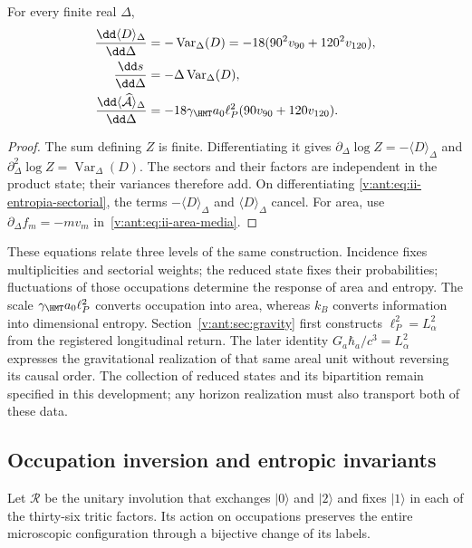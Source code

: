 \begin{proposition}
For every finite real $\Delta$,
\begin{align}
 \frac{\dd\langle D\rangle_\Delta}{\dd\Delta}
 &=-\operatorname{Var}_\Delta(D)
   =-18(90^2v_{90}+120^2v_{120}),\\
 \frac{\dd s}{\dd\Delta}
 &=-\Delta\operatorname{Var}_\Delta(D),
 \label{v:ant:eq:ii-respuesta-entropica}\\
 \frac{\dd\langle\widehat{\mathcal A}\rangle_\Delta}{\dd\Delta}
 &=-18\gamma_{\HMT}a_0\ell_P^2(90v_{90}+120v_{120}).
 \label{v:ant:eq:ii-respuesta-areal}
\end{align}
\end{proposition}
\begin{proof}
The sum defining $Z$ is finite. Differentiating it gives
$\partial_\Delta\log Z=-\langle D\rangle_\Delta$ and
$\partial_\Delta^2\log Z=\operatorname{Var}_\Delta(D)$.
The sectors and their factors are independent in the product state;
their variances therefore add. On differentiating
\eqref{v:ant:eq:ii-entropia-sectorial}, the terms
$-\langle D\rangle_\Delta$ and $\langle D\rangle_\Delta$
cancel. For area, use
$\partial_\Delta f_m=-mv_m$ in~\eqref{v:ant:eq:ii-area-media}.
\end{proof}

These equations relate three levels of the same construction.
Incidence fixes multiplicities and sectorial weights; the
reduced state fixes their probabilities; fluctuations of those
occupations determine the response of area and entropy.
The scale $\gamma_{\HMT}a_0\ell_P^2$ converts occupation into area,
whereas $k_B$ converts information into dimensional entropy.
Section~\ref{v:ant:sec:gravity} first constructs
$\ell_P^2=L_\alpha^2$ from the registered longitudinal return. The later
identity $G_a\hbar_a/c^3=L_\alpha^2$ expresses the gravitational
realization of that same areal unit without reversing its causal order.
The collection of reduced states and its bipartition remain specified
in this development; any horizon realization must also transport
both of these data.

\subsection{Occupation inversion and entropic invariants}
\label{v:ant:sec:ii-inversion-sectorial}

Let $\mathcal R$ be the unitary involution that exchanges $|0\rangle$
and $|2\rangle$ and fixes $|1\rangle$ in each of the thirty-six
tritic factors. Its action on occupations preserves the entire
microscopic configuration through a bijective change of its labels.

